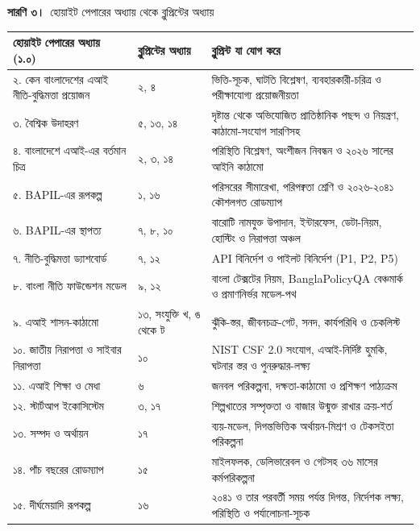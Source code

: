 \documentclass[border=10pt]{standalone}
\begin{document}
\begin{minipage}{17cm}
{\large\bfseries সারণি ৩।}\ {\large হোয়াইট পেপারের অধ্যায় থেকে ব্লুপ্রিন্টের অধ্যায়}\par\vspace{7pt}
\small
{}
\begin{tabularx}{\linewidth}{@{}>{\hsize=0.892\hsize\raggedright\arraybackslash}X>{\hsize=0.649\hsize\raggedright\arraybackslash}X>{\hsize=1.459\hsize\raggedright\arraybackslash}X@{}}
\arrayrulecolor{bapilrule}\toprule
\rowcolor{white}\textbf{হোয়াইট পেপারের অধ্যায় (১.০)} & \textbf{ব্লুপ্রিন্টের অধ্যায়} & \textbf{ব্লুপ্রিন্ট যা যোগ করে} \\
\midrule
২. কেন বাংলাদেশের এআই নীতি-বুদ্ধিমত্তা প্রয়োজন & ২, ৪ & ভিত্তি-সূচক, ঘাটতি বিশ্লেষণ, ব্যবহারকারী-চরিত্র ও পরীক্ষাযোগ্য প্রয়োজনীয়তা \\
৩. বৈশ্বিক উদাহরণ & ৫, ১৩, ১৪ & দৃষ্টান্ত থেকে অভিযোজিত প্রাতিষ্ঠানিক পছন্দ ও নিয়ন্ত্রণ, কাঠামো-সংযোগ সারণিসহ \\
৪. বাংলাদেশে এআই-এর বর্তমান চিত্র & ২, ৩, ১৪ & পরিস্থিতি বিশ্লেষণ, অংশীজন নিবন্ধন ও ২০২৬ সালের আইনি কাঠামো \\
৫. BAPIL-এর রূপকল্প & ১, ১৬ & পরিসরের সীমারেখা, পরিপক্বতা শ্রেণি ও ২০২৬-২০৪১ কৌশলগত রোডম্যাপ \\
৬. BAPIL-এর স্থাপত্য & ৭, ৮, ১০ & বারোটি নামযুক্ত উপাদান, ইন্টারফেস, ডেটা-নিয়ম, হোস্টিং ও নিরাপত্তা অঞ্চল \\
৭. নীতি-বুদ্ধিমত্তা ড্যাশবোর্ড & ৭, ১২ & API বিনির্দেশ ও পাইলট বিনির্দেশ (P1, P2, P5) \\
৮. বাংলা নীতি ফাউন্ডেশন মডেল & ৯, ১২ & বাংলা টেক্সটের নিয়ম, BanglaPolicyQA বেঞ্চমার্ক ও প্রমাণনির্ভর মডেল-পথ \\
৯. এআই শাসন-কাঠামো & ১৩, সংযুক্তি খ, ঙ থেকে ট & ঝুঁকি-স্তর, জীবনচক্র-গেট, সনদ, কার্যপরিধি ও চেকলিস্ট \\
১০. জাতীয় নিরাপত্তা ও সাইবার নিরাপত্তা & ১০ & NIST CSF 2.0 সংযোগ, এআই-নির্দিষ্ট হুমকি, ঘটনার স্তর ও পুনরুদ্ধার-লক্ষ্য \\
১১. এআই শিক্ষা ও মেধা & ৬ & জনবল পরিকল্পনা, দক্ষতা-কাঠামো ও প্রশিক্ষণ পাঠ্যক্রম \\
১২. স্টার্টআপ ইকোসিস্টেম & ৩, ১৭ & শিল্পখাতের সম্পৃক্ততা ও বাজার উন্মুক্ত রাখার ক্রয়-শর্ত \\
১৩. সম্পদ ও অর্থায়ন & ১৭ & ব্যয়-মডেল, দিগন্তভিত্তিক অর্থায়ন-মিশ্রণ ও টেকসইতা পরিকল্পনা \\
১৪. পাঁচ বছরের রোডম্যাপ & ১৫ & মাইলফলক, ডেলিভারেবল ও গেটসহ ৩৬ মাসের কর্মপরিকল্পনা \\
১৫. দীর্ঘমেয়াদি রূপকল্প & ১৬ & ২০৪১ ও তার পরবর্তী সময় পর্যন্ত দিগন্ত, নির্দেশক লক্ষ্য, পরিস্থিতি ও পর্যালোচনা-সূচক \\

\end{tabularx}
\end{minipage}
\end{document}
